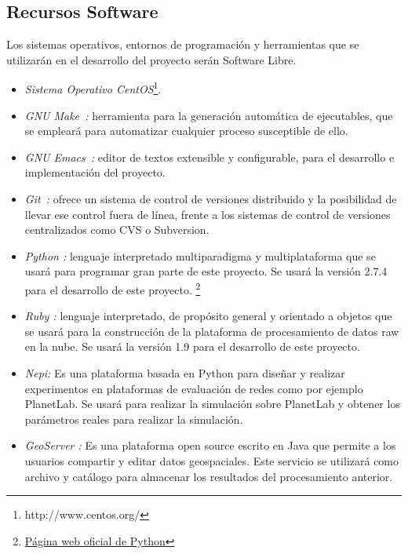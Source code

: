 \subsection{Recursos Software}
\label{sec:software}
Los sistemas operativos, entornos de programación y herramientas que se
utilizarán en el desarrollo del proyecto serán Software Libre.

\begin{itemize}

\item \emph {Sistema Operativo CentOS}\footnote{http://www.centos.org/}.

\item \emph{GNU Make~\cite{make}:}
  herramienta para la generación automática de
  ejecutables, que se empleará para automatizar cualquier proceso susceptible de
  ello.

\item \emph{GNU Emacs~\cite{emacs}:}
  editor de textos extensible y configurable, para el desarrollo e implementación del proyecto.


\item\emph{ Git~\cite{git}:} ofrece un
  sistema de control de versiones distribuido y la posibilidad de llevar ese
  control fuera de línea, frente a los sistemas de control de versiones
  centralizados como \textsc{CVS} o Subversion. %

\item \emph{Python \cite{Python}:} lenguaje interpretado multiparadigma y multiplataforma que se usará para programar gran parte de este proyecto. Se usará la versión 2.7.4 para el desarrollo de este proyecto.
\footnote{\href{http://python.org}{Página web oficial de Python}}

\item \emph{Ruby \cite{Ruby}:} lenguaje interpretado, de propósito general y orientado a objetos que se usará para la construcción de la plataforma de procesamiento de datos raw en la nube.
Se usará la versión 1.9 para el desarrollo de este proyecto.

\item \emph{Nepi\cite{Nepi}:} Es una plataforma basada en Python para diseñar y realizar experimentos en plataformas de evaluación de redes como por ejemplo PlanetLab. Se usará para realizar la simulación sobre PlanetLab y obtener los parámetros reales para realizar la simulación.

\item \emph{GeoServer \cite{GS}:} Es una plataforma open source escrito en Java que permite a los usuarios compartir y editar datos geospaciales. Este servicio se utilizará como archivo y catálogo para almacenar los resultados del procesamiento anterior.



\end{itemize}


